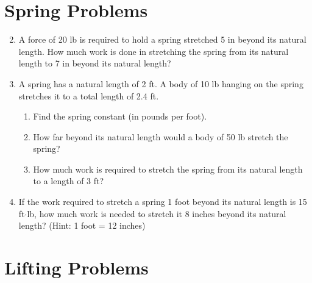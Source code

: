 \documentclass[12pt]{article}
\newif\ifans
\begin{document}
\section*{Spring Problems}

\begin{enumerate}
\setcounter{enumi}{1}

\item A force of 20 lb is required to hold a spring stretched 5 in beyond its natural length.  How much work is done in stretching the spring from its natural length to 7 in beyond its natural length?

\ifans{\fbox{$98 \text{ in}\cdot\text{lb}=\frac{49}{6} \text{ ft}\cdot\text{lb}$ }} \fi

\newpage

\item A spring has a natural length of 2 ft.  A body of 10 lb hanging on the spring stretches it to a total length of 2.4 ft.

\begin{enumerate}

\item Find the spring constant (in pounds per foot).

\ifans{\fbox{$F(x)=kx$, where $k=25$}} \fi

\item  How far beyond its natural length would a body of 50 lb stretch the spring?

\ifans{\fbox{The spring will stretch 2 ft beyond its natural length to a total length of 4 ft.}} \fi

\item How much work is required to stretch the spring from its natural length to a length of 3 ft?

\ifans{\fbox{$\frac{25}{2} \text{ ft}\cdot\text{lb}$}} \fi

\end{enumerate}

\item If the work required to stretch a spring 1 foot beyond its natural length is 15 ft$\cdot$lb, how much work is needed to stretch it 8 inches beyond its natural length? (Hint: 1 foot = 12 inches)

\ifans{\fbox{$\frac{20}{3} \text{ ft}\cdot\text{lb}$}} \fi

\end{enumerate}

\section*{Lifting Problems}
\end{document}
